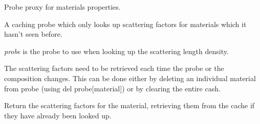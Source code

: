 \documentclass[letterpaper,10pt,english]{sphinxmanual}
\begin{document}
\begin{fulllineitems}
\label{api/material:refl1d.material.ProbeCache}
Probe proxy for materials properties.

A caching probe which only looks up scattering factors for materials
which it hasn't seen before.

\emph{probe} is the probe to use when looking up the scattering length density.

The scattering factors need to be retrieved each time the probe
or the composition changes. This can be done either by deleting
an individual material from probe (using del probe{[}material{]}) or
by clearing the entire cash.

\begin{fulllineitems}
\label{api/material:refl1d.material.ProbeCache.clear}
\end{fulllineitems}


\begin{fulllineitems}
\label{api/material:refl1d.material.ProbeCache.scattering_factors}
Return the scattering factors for the material, retrieving them from
the cache if they have already been looked up.

\end{fulllineitems}


\end{fulllineitems}
\end{document}
